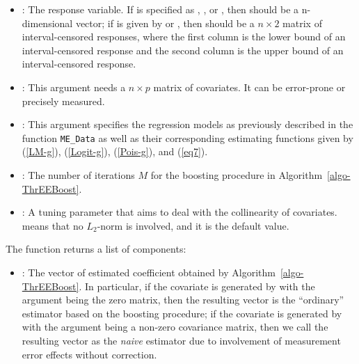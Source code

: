 \begin{itemize}
    \item {}: {The response variable}. If  is specified as , , or , then  should be a n-dimensional vector; if  is given by  or , then  should be a $n \times 2$ matrix of interval-censored responses, where the first column is the lower bound of an interval-censored response and the second column is the upper bound of an interval-censored response.
    
    \item {}: This argument needs a $n \times p$ matrix of covariates. It can be error-prone or precisely measured.
    
    \item {}: This argument {specifies} the regression models as previously described in the function \texttt{ME\_Data} as well as their corresponding estimating functions given by (\ref{LM-g}),  (\ref{Logit-g}), (\ref{Pois-g}), and (\ref{eq7}).

    
    \item {}: The number of iterations $M$ for the boosting procedure in Algorithm~\ref{algo-ThrEEBoost}.
    
    \item {}: A tuning parameter that aims to deal with the collinearity of covariates.  means that no $L_2$-norm is involved, and it is {the} default value.
    
\end{itemize}

The function  returns a list of components:

\begin{itemize}
    \item {}: The vector of estimated coefficient obtained by Algorithm~\ref{algo-ThrEEBoost}. In particular, if the covariate  is generated by  with the argument  being the zero matrix, then the resulting vector is the ``ordinary'' estimator based on the boosting procedure; if the covariate  is generated by  with the argument  being a non-zero covariance matrix, then we call the resulting vector as the {\em naive} estimator due to involvement of measurement error effects without correction.
    

\end{itemize}


